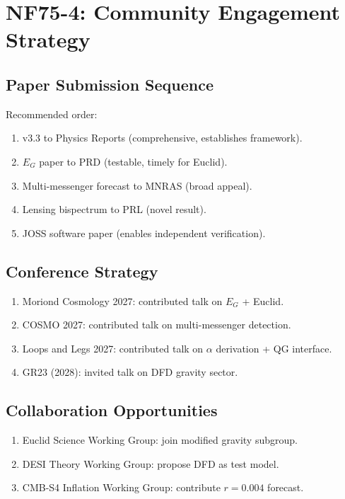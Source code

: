 \documentclass[11pt,a4paper]{article}
\begin{document}
\section{NF75-4: Community Engagement Strategy}

\subsection{Paper Submission Sequence}
Recommended order:
\begin{enumerate}[nosep]
\item v3.3 to Physics Reports (comprehensive, establishes framework).
\item $E_G$ paper to PRD (testable, timely for Euclid).
\item Multi-messenger forecast to MNRAS (broad appeal).
\item Lensing bispectrum to PRL (novel result).
\item JOSS software paper (enables independent verification).
\end{enumerate}

\subsection{Conference Strategy}
\begin{enumerate}[nosep]
\item Moriond Cosmology 2027: contributed talk on $E_G$ + Euclid.
\item COSMO 2027: contributed talk on multi-messenger detection.
\item Loops and Legs 2027: contributed talk on $\alpha$ derivation + QG interface.
\item GR23 (2028): invited talk on DFD gravity sector.
\end{enumerate}

\subsection{Collaboration Opportunities}
\begin{enumerate}[nosep]
\item Euclid Science Working Group: join modified gravity subgroup.
\item DESI Theory Working Group: propose DFD as test model.
\item CMB-S4 Inflation Working Group: contribute $r = 0.004$ forecast.
\end{enumerate}
\end{document}
